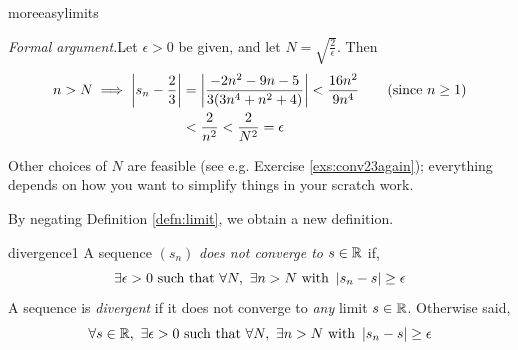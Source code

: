 \begin{examples}{}{moreeasylimits}
\begin{enumerate}
		\emph{Formal argument.}\quad Let $\epsilon>0$ be given, and let $N=\sqrt{\frac 2\epsilon}$. Then
		\begin{align*}
			n>N\implies \left| s_n-\frac 23\right|&=\left| \frac{-2n^2-9n-5}{3(3n^4+n^2+4)}\right| <\frac{16n^2}{9n^4} \tag{since $n\ge 1$}\\
			&< \frac 2{n^2}<\frac 2{N^2}=\epsilon
		\end{align*}

		Other choices of $N$ are feasible (see e.g.{} Exercise \ref{exs:conv23again}); everything depends on how you want to simplify things in your scratch work.
		
	\end{enumerate}
\end{examples}

\vfil

\goodbreak


By negating Definition \ref{defn:limit}, we obtain a new definition.

\begin{defn}{}{divergence1}
A sequence $(s_n)$ \emph{does not converge to $s\in\mathbb{R}$} if,
\[\exists \epsilon>0\ \text{such that}\ \forall N,\ \exists n>N\ \text{with}\ \nm{s_n-s}\ge\epsilon\]
A sequence is \emph{divergent} if it does not converge to \emph{any} limit $s\in\mathbb{R}$. Otherwise said,
\[\forall s\in\R,\ \exists \epsilon>0\ \text{such that}\ \forall N,\ \exists n>N\ \text{with}\ \nm{s_n-s}\ge\epsilon\]
\end{defn}




